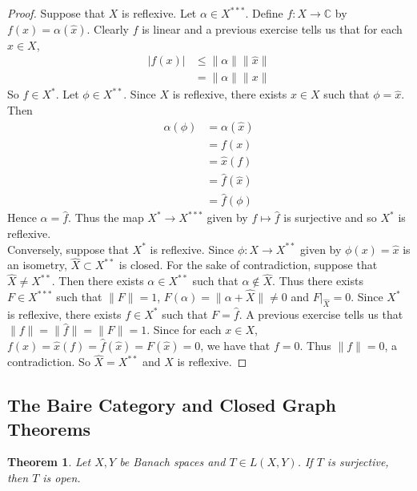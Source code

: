 \documentclass[12pt]{amsart}
\newtheorem{thm}{Theorem}[subsection]
\theoremstyle{definition}
\theoremstyle{remark}
\theoremstyle{definition}
\newcommand{\al}{\alpha}
\newcommand{\C}{\mathbb{C}}
\begin{document}
	\begin{proof}
		Suppose that $X$ is reflexive. Let $\al \in X^{***}$. Define $f :X \rightarrow \C$ by $f(x) = \al(\hat{x})$. Clearly $f$ is linear and a previous exercise tells us that for each $x \in X$, 
		\begin{align*}
			\vert f(x) \vert 
			& \leq \|\al \|\|\hat{x} \|\\
			&= \|\al \|\|x \|
		\end{align*}
		So $f \in X^*$.
		Let $\phi \in X^{**}$. Since $X$ is reflexive, there exists $x \in X$ such that $\phi = \hat{x}$. Then 
		\begin{align*}
			\al(\phi)
			&= \al(\hat{x})\\
			&= f(x)\\
			&= \hat{x}(f)\\
			&= \hat{f}(\hat{x})\\
			&= \hat{f}(\phi)
		\end{align*}
		Hence $\al = \hat{f}$. Thus the map $X^* \rightarrow X^{***}$ given by $f \mapsto \hat{f} $ is surjective and so $X^{*}$ is reflexive.\vspace{.5cm}\\
		Conversely, suppose that $X^*$ is reflexive. Since $\phi:X \rightarrow X^{**}$ given by $\phi(x) = \hat{x}$ is an isometry, $\widehat{X} \subset X^{**}$ is closed. For the sake of contradiction, suppose that $\widehat{X} \neq X^{**}$. Then there exists $\al \in X^{**}$ such that $\al \not \in \widehat{X}$. Thus there exists $F \in X^{***}$ such that $\|F \|= 1$, $F(\al) = \|\al + \widehat{X} \|\neq 0$ and $F|_{\widehat{X}}=0$. Since $X^*$ is reflexive, there exists $f \in X^*$ such that $F = \hat{f}$. A previous exercise tells us that $\|f \|= \|\hat{f} \|= \|F \|= 1$. Since for each $x \in X$, $f(x) = \hat{x}(f) = \hat{f}(\hat{x}) = F(\hat{x}) = 0$, we have that $f = 0$. Thus $\|f \|= 0$, a contradiction. So $\widehat{X} = X^{**}$ and $X$ is reflexive.
		
	\end{proof}
	
	\newpage
	
	\subsection{The Baire Category and Closed Graph Theorems}
	
	\begin{thm}
		Let $X, Y$ be Banach spaces and $T\in L(X,Y)$. If $T$ is surjective, then $T$ is open.
	\end{thm}
	
\end{document}
